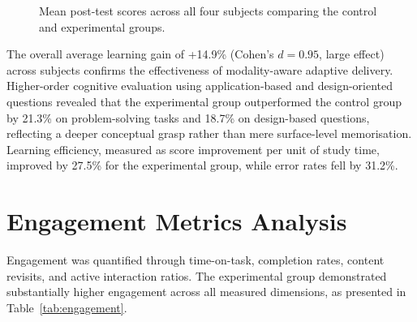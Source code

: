 \begin{figure}[htb]
	\centering
	\caption{Mean post-test scores across all four subjects comparing the control and experimental groups.}
	\label{fig:posttest}
\end{figure}

The overall average learning gain of +14.9\% (Cohen's $d = 0.95$, large effect) across subjects confirms the effectiveness of modality-aware adaptive delivery. Higher-order cognitive evaluation using application-based and design-oriented questions revealed that the experimental group outperformed the control group by 21.3\% on problem-solving tasks and 18.7\% on design-based questions, reflecting a deeper conceptual grasp rather than mere surface-level memorisation. Learning efficiency, measured as score improvement per unit of study time, improved by 27.5\% for the experimental group, while error rates fell by 31.2\%.

\section{Engagement Metrics Analysis}

Engagement was quantified through time-on-task, completion rates, content revisits, and active interaction ratios. The experimental group demonstrated substantially higher engagement across all measured dimensions, as presented in Table~\ref{tab:engagement}.

